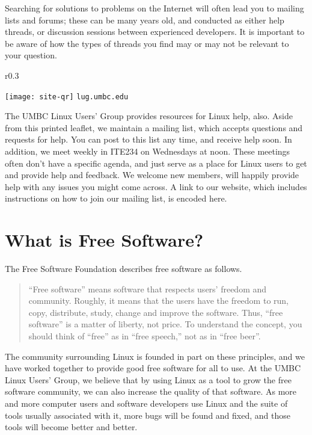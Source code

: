 \documentclass[11pt,notumble]{leaflet}
\begin{document}
Searching for solutions to problems on the Internet will often lead you to
mailing lists and forums; these can be many years old, and conducted as either
help threads, or discussion sessions between experienced developers. It is
important to be aware of how the types of threads you find may or may not be
relevant to your question.

\begin{wrapfigure}{r}{0.3\textwidth}
    \vspace{-3em}
    \begin{center}
        \texttt{[image: site-qr]}
        \vspace{-2em}
        \texttt{lug.umbc.edu}
    \end{center}
\end{wrapfigure}

The UMBC Linux Users' Group provides resources for Linux help, also. Aside from
this printed leaflet, we maintain a mailing list, which accepts questions and
requests for help. You can post to this list any time, and receive help soon. In
addition, we meet weekly in ITE234 on Wednesdays at noon. These meetings often
don't have a specific agenda, and just serve as a place for Linux users to get
and provide help and feedback. We welcome new members, will happily provide help
with any issues you might come across. A link to our website, which includes
instructions on how to join our mailing list, is encoded here.

\section{What is Free Software?}
\label{section:free-software}

The Free Software Foundation describes free software as follows.

\begin{quote}
    “Free software” means software that respects users' freedom and community.
    Roughly, it means that the users have the freedom to run, copy, distribute,
    study, change and improve the software. Thus, “free software” is a matter of
    liberty, not price. To understand the concept, you should think of “free” as
    in “free speech,” not as in “free beer”.
\end{quote}

The community surrounding Linux is founded in part on these principles, and we
have worked together to provide good free software for all to use. At the UMBC
Linux Users' Group, we believe that by using Linux as a tool to grow the free
software community, we can also increase the quality of that software. As more
and more computer users and software developers use Linux and the suite of tools
usually associated with it, more bugs will be found and fixed, and those tools
will become better and better.
\end{document}
